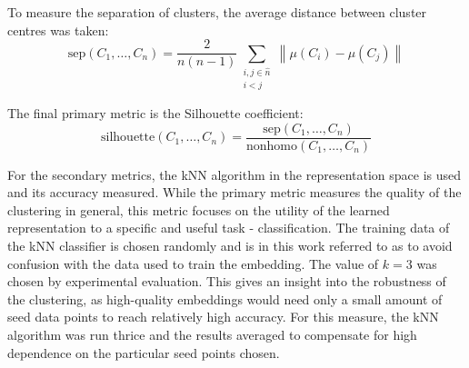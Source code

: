 To measure the separation of clusters, the average distance between cluster centres was taken:
\[ \mathrm{sep} \left( C_1, \dots, C_n \right) = \frac{2}{n \left( n - 1 \right)} \sum_{\substack{i, j \in \hat{n} \\ i < j }} \left\lVert \mu \left( C_i \right) - \mu \left( C_j \right) \right\rVert \]

The final primary metric is the Silhouette coefficient:
\[ \mathrm{silhouette} \left( C_1, \dots, C_n \right) = \frac{\mathrm{sep} \left( C_1, \dots, C_n \right)}{\mathrm{nonhomo} \left( C_1, \dots, C_n \right)} \]

For the secondary metrics, the kNN algorithm in the representation space is used and its accuracy measured. While the primary metric measures the quality of the clustering in general, this metric focuses on the utility of the learned representation to a specific and useful task - classification. The training data of the kNN classifier is chosen randomly and is in this work referred to as  to avoid confusion with the data used to train the embedding. The value of \( k = 3 \) was chosen by experimental evaluation. This gives an insight into the robustness of the clustering, as high-quality embeddings would need only a small amount of seed data points to reach relatively high accuracy. For this measure, the kNN algorithm was run thrice and the results averaged to compensate for high dependence on the particular seed points chosen.
